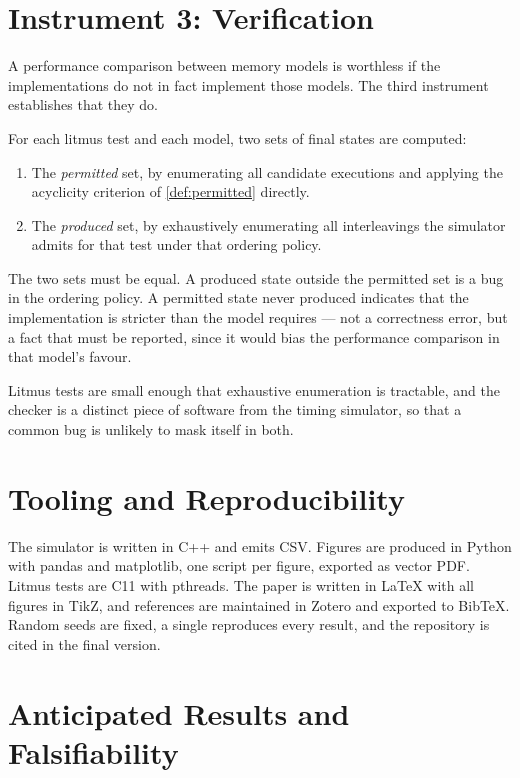 \section{Instrument 3: Verification}
\label{sec:verif-method}

A performance comparison between memory models is worthless if the implementations
do not in fact implement those models.
The third instrument establishes that they
do.

For each litmus test and each model, two sets of final states are computed:

\begin{enumerate}
\item The \emph{permitted} set, by enumerating all candidate executions and
  applying the acyclicity criterion of \cref{def:permitted} directly.
\item The \emph{produced} set, by exhaustively enumerating all interleavings the
  simulator admits for that test under that ordering policy.
\end{enumerate}

The two sets must be equal. A produced state outside the permitted set is a bug in
the ordering policy.
A permitted state never produced indicates that the
implementation is stricter than the model requires --- not a correctness error, but
a fact that must be reported, since it would bias the performance comparison in
that model's favour.

Litmus tests are small enough that exhaustive enumeration is tractable, and the
checker is a distinct piece of software from the timing simulator, so that a
common bug is unlikely to mask itself in both.

\section{Tooling and Reproducibility}

The simulator is written in C++ and emits CSV. Figures are produced in Python with
pandas and matplotlib, one script per figure, exported as vector PDF. Litmus tests
are C11 with pthreads.
The paper is written in \LaTeX{} with all figures in TikZ,
and references are maintained in Zotero and exported to BibTeX. Random seeds are
fixed, a single  reproduces every result, and the repository is
cited in the final version.

\section{Anticipated Results and Falsifiability}

